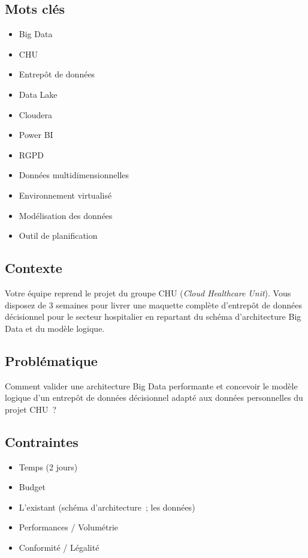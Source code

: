 \subsection*{Mots clés}
{}
\begin{itemize}
	\item Big Data
	\item CHU
	\item Entrepôt de données
	\item Data Lake
	\item Cloudera
	\item Power BI
	\item RGPD
	\item Données multidimensionnelles
	\item Environnement virtualisé
	\item Modélisation des données
	\item Outil de planification
\end{itemize}

\subsection*{Contexte}
{}
\noindent Votre équipe reprend le projet du groupe CHU (\textit{Cloud Healthcare Unit}). Vous disposez de 3 semaines pour livrer une maquette complète d'entrepôt de données décisionnel pour le secteur hospitalier en repartant du schéma d'architecture Big Data et du modèle logique.

\subsection*{Problématique}
{}
\noindent Comment valider une architecture Big Data performante et concevoir le modèle logique d'un entrepôt de données décisionnel adapté aux données personnelles du projet CHU~?

\subsection*{Contraintes}
{}
\begin{itemize}
	\item Temps (2 jours)
	\item Budget
	\item L'existant (schéma d'architecture~; les données)
	\item Performances / Volumétrie
	\item Conformité / Légalité
\end{itemize}

